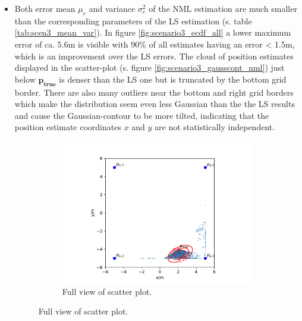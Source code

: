 \documentclass{article}
\begin{document}
\begin{itemize}
\item Both error mean $\mu_e$ and variance $\sigma^2_e$ of the NML estimation are much smaller than the corresponding parameters of the LS estimation (s. table \ref{tab:scen3_mean_var}). In figure \ref{fig:scenario3_ecdf_all} a lower maximum error of ca. 5.6m is visible with 90\% of all estimates having an error < 1.5m, which is an improvement over the LS errors. The cloud of position estimates displayed in the scatter-plot (s. figure \ref{fig:scenario3_gausscont_nml}) just below $\mathbf{p_{true}}$ is denser than the LS one but is truncated by the bottom grid border. There are also many outliers near the bottom and right grid borders which make the distribution seem even less Gaussian than the the LS results and cause the Gaussian-contour to be more tilted, indicating that the position estimate coordinates $x$ and $y$ are not statistically independent. 

\begin{figure}
\begin{subfigure}{\textwidth}
\centering
\includegraphics[width=\textwidth]{./figures/scenario3_gausscont_small_nml.pdf}
\caption{Full view of scatter plot.}
\end{subfigure}


\end{figure}
\end{itemize}
\end{document}
